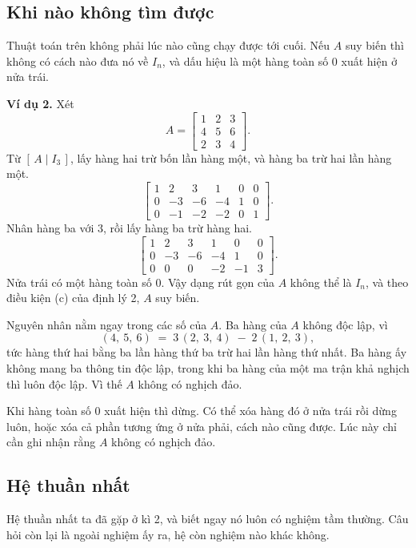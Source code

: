 \documentclass[12pt,a4paper]{article}
\begin{document}
\subsection{Khi nào không tìm được}

Thuật toán trên không phải lúc nào cũng chạy được tới cuối. Nếu \(A\) suy biến thì không có cách nào đưa nó về \(I_n\), và dấu hiệu là một hàng toàn số \(0\) xuất hiện ở nửa trái.

\textbf{Ví dụ 2.} Xét
$$
A=\left[ \begin{array}{rrr} 1 & 2 & 3\\ 4 & 5 & 6\\ 2 & 3 & 4 \end{array} \right].
$$
Từ \([\,A\mid I_3\,]\), lấy hàng hai trừ bốn lần hàng một, và hàng ba trừ hai lần hàng một.
$$
\left[ \begin{array}{rrr|rrr} 1 & 2 & 3 & 1 & 0 & 0\\ 0 & -3 & -6 & -4 & 1 & 0\\ 0 & -1 & -2 & -2 & 0 & 1 \end{array} \right].
$$
Nhân hàng ba với \(3\), rồi lấy hàng ba trừ hàng hai.
$$
\left[ \begin{array}{rrr|rrr} 1 & 2 & 3 & 1 & 0 & 0\\ 0 & -3 & -6 & -4 & 1 & 0\\ 0 & 0 & 0 & -2 & -1 & 3 \end{array} \right].
$$
Nửa trái có một hàng toàn số \(0\). Vậy dạng rút gọn của \(A\) không thể là \(I_n\), và theo điều kiện (c) của định lý 2, \(A\) suy biến.

Nguyên nhân nằm ngay trong các số của \(A\). Ba hàng của \(A\) không độc lập, vì
$$
(4,\ 5,\ 6)\;=\;3\,(2,\ 3,\ 4)\;-\;2\,(1,\ 2,\ 3),
$$
tức hàng thứ hai bằng ba lần hàng thứ ba trừ hai lần hàng thứ nhất. Ba hàng ấy không mang ba thông tin độc lập, trong khi ba hàng của một ma trận khả nghịch thì luôn độc lập. Vì thế \(A\) không có nghịch đảo.

Khi hàng toàn số \(0\) xuất hiện thì dừng. Có thể xóa hàng đó ở nửa trái rồi dừng luôn, hoặc xóa cả phần tương ứng ở nửa phải, cách nào cũng được. Lúc này chỉ cần ghi nhận rằng \(A\) không có nghịch đảo.

\subsection{Hệ thuần nhất}

Hệ thuần nhất ta đã gặp ở kì 2, và biết ngay nó luôn có nghiệm tầm thường. Câu hỏi còn lại là ngoài nghiệm ấy ra, hệ còn nghiệm nào khác không.
\end{document}
